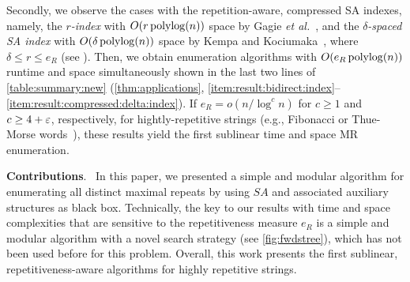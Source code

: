 Secondly, we observe the cases with the repetition-aware, compressed SA indexes, namely,
the \textit{$r$-index} with $O(r\operatorname{\mathrm{polylog}}(n))$ space by Gagie \textit{et al.}~\cite{gagie:navarro:prezza2020fully}, and
the \textit{$\delta$-spaced SA index} with $O(\delta\operatorname{\mathrm{polylog}}(n))$ space by Kempa and Kociumaka~\cite{kempa:kociumaka2023collapsing}, where $\delta \le r \le e_R$ (see \cite{kociumaka:navarro:olivares2024near:delta:optimal,kempa2018roots,belazzougui:cunial:gagie:prezza:raffinot2015composite}).
Then, we obtain enumeration algorithms with $O(e_R\operatorname{\mathrm{polylog}}(n))$ runtime and space simultaneously shown in the last two lines of \cref{table:summary:new} (\cref{thm:applications}, \ref{item:result:bidirect:index}--\ref{item:result:compressed:delta:index}). 
If $e_R = o(n/\log^c n)$ for $c\ge 1$ and $c\ge 4+\varepsilon$, respectively, for hightly-repetitive strings (e.g., Fibonacci or Thue-Morse words~\cite{radoszewski:rytter2012structure:cdawg:thuemorse}), these results yield the first sublinear time and space MR enumeration. 


\textbf{Contributions}.\ 
In this paper, we presented a simple and modular algorithm for enumerating all distinct maximal repeats by using $SA$ and associated auxiliary structures as black box.
Technically, the key to our results with time and space complexities that are  sensitive to the repetitiveness measure $e_R$ is a simple and modular algorithm with a novel search strategy (see \cref{fig:fwdstree}), which has not been used before for this problem. 
Overall, this work presents the first sublinear, repetitiveness-aware algorithms for highly repetitive strings.



